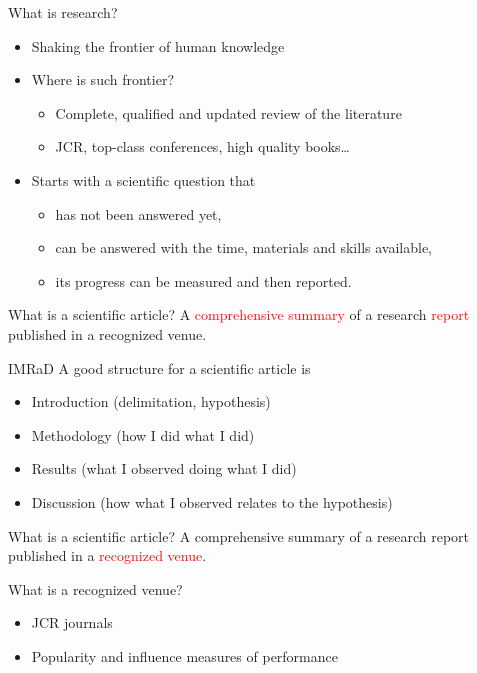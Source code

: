 \documentclass[professionalfonts,table,serif,aspectratio=1610]{beamer}
\begin{document}
\begin{frame}{What is research?}
\begin{itemize}[<+-| alert@+>]
\item Shaking the frontier of human knowledge
\item Where is such frontier?
	\begin{itemize}
	\item Complete, qualified and updated review of the literature
	\item JCR, top-class conferences, high quality books\dots
	\end{itemize}
\item Starts with a scientific question that
	\begin{itemize}
	\item has not been answered yet,
	\item can be answered with the time, materials and skills available,
	\item its progress can be measured and then reported.
	\end{itemize}
\end{itemize}
\end{frame}

\begin{frame}{What is a scientific article?}
A \textcolor{red}{comprehensive summary} of a research \textcolor{red}{report} published in a recognized venue.
\end{frame}

\begin{frame}{IMRaD}
A good structure for a scientific article is
\begin{itemize}
\item Introduction (delimitation, hypothesis)
\item Methodology (how I did what I did)
\item Results (what I observed doing what I did)
\item Discussion (how what I observed relates to the hypothesis)
\end{itemize}
\end{frame}

\begin{frame}{What is a scientific article?}
A comprehensive summary of a research report published in a \textcolor{red}{recognized venue}.
\end{frame}

\begin{frame}{What is a recognized venue?}
\begin{itemize}
\item JCR journals
\item Popularity and influence measures of performance
\end{itemize}
\end{frame}
\end{document}
